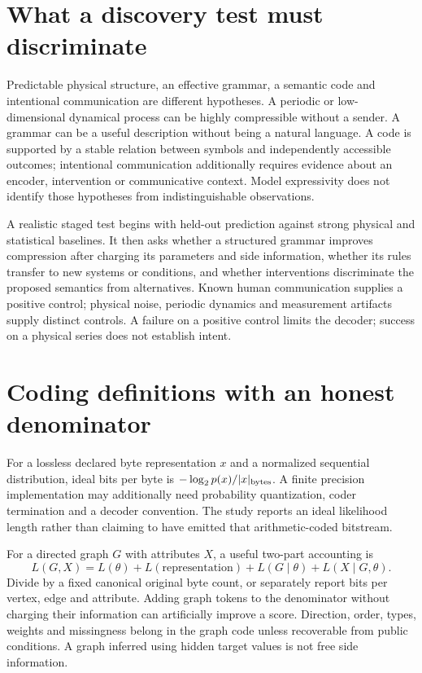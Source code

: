 \section{What a discovery test must discriminate}

Predictable physical structure, an effective grammar, a semantic code and intentional communication are different hypotheses. A periodic or low-dimensional dynamical process can be highly compressible without a sender. A grammar can be a useful description without being a natural language. A code is supported by a stable relation between symbols and independently accessible outcomes; intentional communication additionally requires evidence about an encoder, intervention or communicative context. Model expressivity does not identify those hypotheses from indistinguishable observations.

A realistic staged test begins with held-out prediction against strong physical and statistical baselines. It then asks whether a structured grammar improves compression after charging its parameters and side information, whether its rules transfer to new systems or conditions, and whether interventions discriminate the proposed semantics from alternatives. Known human communication supplies a positive control; physical noise, periodic dynamics and measurement artifacts supply distinct controls. A failure on a positive control limits the decoder; success on a physical series does not establish intent.

\section{Coding definitions with an honest denominator}

For a lossless declared byte representation $x$ and a normalized sequential distribution, ideal bits per byte is $-\log_2p(x)/|x|_{\rm bytes}$. A finite precision implementation may additionally need probability quantization, coder termination and a decoder convention. The study reports an ideal likelihood length rather than claiming to have emitted that arithmetic-coded bitstream.

For a directed graph $G$ with attributes $X$, a useful two-part accounting is
\[
 L(G,X)=L(\theta)+L(\text{representation})+L(G\mid\theta)
       +L(X\mid G,\theta).
\]
Divide by a fixed canonical original byte count, or separately report bits per vertex, edge and attribute. Adding graph tokens to the denominator without charging their information can artificially improve a score. Direction, order, types, weights and missingness belong in the graph code unless recoverable from public conditions. A graph inferred using hidden target values is not free side information.

